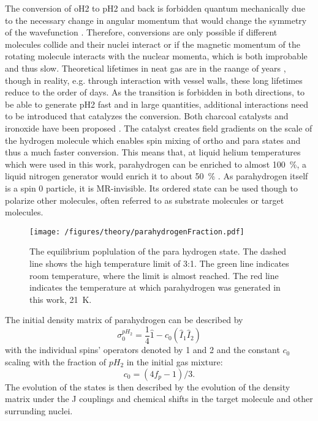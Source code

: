             The conversion of oH2 to pH2 and back is forbidden quantum mechanically due to the necessary change in angular momentum that would change the symmetry of the wavefunction \cite{minaev_spin_1995}. Therefore, conversions are only possible if different molecules collide and their nuclei interact or if the magnetic momentum of the rotating molecule interacts with the nuclear momenta, which is both improbable and thus slow. Theoretical lifetimes in neat gas are in the raange of years \cite{green_theory_2012-1}, though in reality, e.g. through interaction with vessel walls, these long lifetimes reduce to the order of days. As the transition is forbidden in both directions, to be able to generate pH2 fast and in large quantities, additional interactions need to be introduced that catalyzes the conversion. Both charcoal catalysts and ironoxide have been proposed \cite{dechent_proton_nodate}. The catalyst creates field gradients on the scale of the hydrogen molecule which enables spin mixing of ortho and para states\cite{minaev_spin_1995} and thus a much faster conversion. This means that, at liquid helium temperatures which were used in this work, parahydrogen can be enriched to almost \SI{100}{\%}, a liquid nitrogen generator would enrich it to about \SI{50}{\%} \cite{zhuzhgov_low-temperature_2018}.
            As parahydrogen itself is a spin 0 particle, it is MR-invisible. Its ordered state can be used though to polarize other molecules, often referred to as substrate molecules or target molecules.
            \begin{figure}
                \centering
                \texttt{[image: /figures/theory/parahydrogenFraction.pdf]}
                \caption[Parahydrogen fraction]{The equilibrium poplulation of the para hydrogen state. The dashed line shows the high temperature limit of 3:1. The green line indicates room temperature, where the limit is almost reached. The red line indicates the temperature at which parahydrogen was generated in this work, \SI{21}{\kelvin}.}
                \label{figure:theory:ph2Fraction}
            \end{figure}
            The initial density matrix of parahydrogen can be described by
            \begin{equation}
                \sigma_0^{pH_2} = \frac{1}{4} \hat 1 - c_0(\hat{I}_1\hat{I}_2)
            \end{equation}
            with the individual spins' operators denoted by 1 and 2 \cite{green_theory_2012-1} and the constant $c_0$ scaling with the fraction of $pH_2$ in the initial gas mixture:
            \begin{equation*}
                c_0=(4f_p-1)/3.
            \end{equation*}
            The evolution of the states is then described by the evolution of the density matrix under the J couplings and chemical shifts in the target molecule and other surrunding nuclei. 

